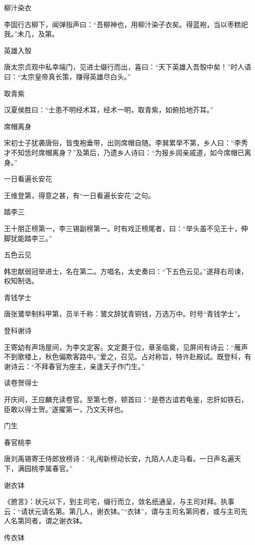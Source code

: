 \documentclass[a4paper,12pt,UTF8,twoside]{ctexbook}
\begin{document}
    柳汁染衣
    
    李固行古柳下，闻弹指声曰：“吾柳神也，用柳汁染子衣矣。得蓝袍，当以枣糕祀我。”未几，及第。
    
    英雄入彀
    
    唐太宗贞观中私幸端门，见进士缀行而出，喜曰：“天下英雄入吾彀中矣！”时人语曰：“太宗皇帝真长策，赚得英雄尽白头。”
    
    取青紫
    
    汉夏侯胜曰：“士患不明经术耳，经术一明，取青紫，如俯拾地芥耳。”
    
    席帽离身
    
    宋初士子犹袭唐俗，皆曳袍垂带，出则席帽自随。李巽累举不第，乡人曰：“李秀才不知恁时席帽离身？”及第后，乃遗乡人诗曰：“为报乡闾亲戚道，如今席帽已离身。”
    
    一日看遍长安花
    
    王维登第，得意之甚，有“一日看遍长安花”之句。
    
    踏李三
    
    王十朋正榜第一，李三锡副榜第一。时有戏正榜尾者，曰：“举头虽不见王十，伸脚犹能踏李三。”
    
    五色云见
    
    韩忠献弱冠举进士，名在第二。方唱名，太史奏曰：“下五色云见。”遂拜右司谏，权知制诰。
    
    青钱学士
    
    唐张鷟举制科甲第，员半千称：鷟文辞犹青铜钱，万选万中。时号“青钱学士”。
    
    登科谢诗
    
    王寄幼有声场屋间，为李文定客。文定薨于位，章圣临奠，见屏间有诗云：“雁声不到歌楼上，秋色偏欺客路中。”爱之，召见。占对称旨，特许赴殿试。既登科，有谢诗云：“不拜春官为座主，亲逢天子作门生。”
    
    读卷贺得士
    
    开庆间，王应麟充读卷官。至第七卷，顿首曰：“是卷古谊若龟鉴，忠肝如铁石，臣敢以得士贺。”遂擢第一，乃文天祥也。
    
    门生
    
    春官桃李
    
    唐刘禹锡寄王侍郎放榜诗：“礼闱新榜动长安，九陌人人走马看。一日声名遍天下，满园桃李属春官。”
    
    谢衣钵
    
    《摭言》：状元以下，到主司宅，缀行而立，敛名纸通呈，与主司对拜。执事云：“请状元请名第。第几人，谢衣钵。”“衣钵”，谓与主司名第同者，或与主司先人名第同者，谓之谢衣钵。
    
    传衣钵
    
\end{document}
